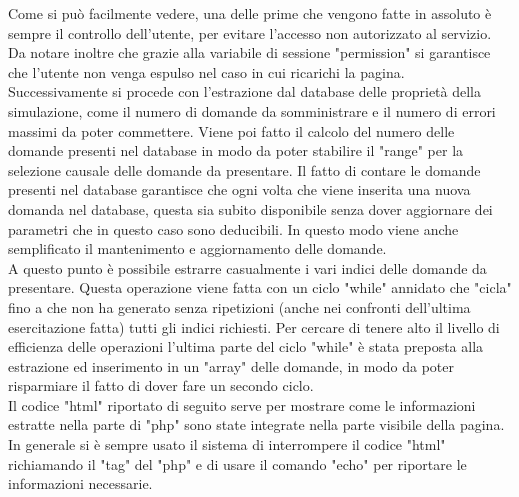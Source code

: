 Come si può facilmente vedere, una delle prime che vengono fatte in assoluto è sempre il controllo dell'utente, per evitare l'accesso non autorizzato al servizio. Da notare inoltre che grazie alla variabile di sessione "permission" si garantisce che l'utente non venga espulso nel caso in cui ricarichi la pagina.\\
Successivamente si procede con l'estrazione dal database delle proprietà della simulazione, come il numero di domande da somministrare e il numero di errori massimi da poter commettere. Viene poi fatto il calcolo del numero delle domande presenti nel database in modo da poter stabilire il "range" per la selezione causale delle domande da presentare. Il fatto di contare le domande presenti nel database garantisce che ogni volta che viene inserita una nuova domanda nel database, questa sia subito disponibile senza dover aggiornare dei parametri che in questo caso sono deducibili. In questo modo viene anche semplificato il mantenimento e aggiornamento delle domande.\\
A questo punto è possibile estrarre casualmente i vari indici delle domande da presentare. Questa operazione viene fatta con un ciclo "while" annidato che "cicla" fino a che non ha generato senza ripetizioni (anche nei confronti dell'ultima esercitazione fatta) tutti gli indici richiesti. Per cercare di tenere alto il livello di efficienza delle operazioni l'ultima parte del ciclo "while" è stata preposta alla estrazione ed inserimento in un "array" delle domande, in modo da poter risparmiare il fatto di dover fare un secondo ciclo.\\

Il codice "html" riportato di seguito serve per mostrare come le informazioni estratte nella parte di "php" sono state integrate nella parte visibile della pagina. In generale si è sempre usato il sistema di interrompere il codice "html" richiamando il "tag" del "php" e di usare il comando "echo" per riportare le informazioni necessarie.\\

